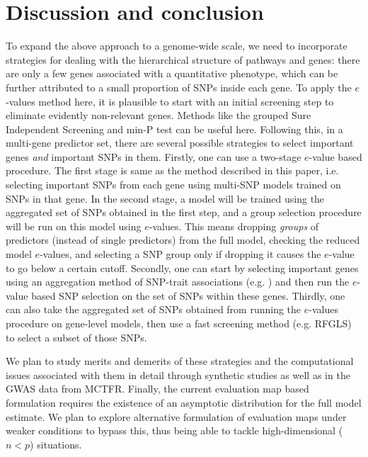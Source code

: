 \section{Discussion and conclusion}
\label{sec:endSection}


To expand the above approach to a genome-wide scale, we need to incorporate strategies for dealing with the hierarchical structure of pathways and genes: there are only a few genes associated with a quantitative phenotype, which can be further attributed to a small proportion of SNPs inside each gene. To apply the $e$-values method here, it is plausible to start with an initial screening step to eliminate evidently non-relevant genes. Methods like the grouped Sure Independent Screening \citep{LiZhongZhu12} and min-P test \citep{WestfallYoungBook93} can be useful here. Following this, in a multi-gene predictor set, there are several possible strategies to select important genes \textit{and} important SNPs in them. Firstly, one can use a two-stage $e$-value based procedure. The first stage is same as the method described in this paper, i.e. selecting important SNPs from each gene using multi-SNP models trained on SNPs in that gene. In the second stage, a model will be trained using the aggregated set of SNPs obtained in the first step, and a group selection procedure will be run on this model using $e$-values. This means dropping \textit{groups} of predictors (instead of single predictors) from the full model, checking the reduced model $e$-values, and selecting a SNP group only if dropping it causes the $e$-value to go below a certain cutoff. Secondly, one can start by selecting important genes using an aggregation method of SNP-trait associations (e.g. \cite{LamparterEtal16}) and then run the $e$-value based SNP selection on the set of SNPs within these genes. Thirdly, one can also take the aggregated set of SNPs obtained from running the $e$-values procedure on gene-level models, then use a fast screening method (e.g. RFGLS) to select a subset of those SNPs.

We plan to study merits and demerits of these strategies and the computational issues associated with them in detail through synthetic studies as well as in the GWAS data from MCTFR. Finally, the current evaluation map based formulation requires the existence of an asymptotic distribution for the full model estimate. We plan to explore alternative formulation of evaluation maps under weaker conditions to bypass this, thus being able to tackle high-dimensional ($n < p$) situations.